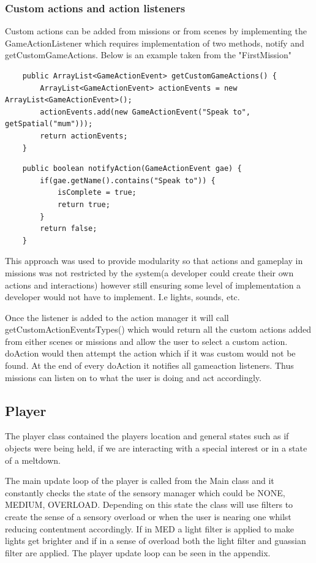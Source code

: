 \documentclass[11pt]{report}
\begin{document}
\subsubsection*{Custom actions and action listeners}
Custom actions can be added from missions or from scenes by implementing the GameActionListener which requires implementation of two methods, notify and getCustomGameActions. Below is an example taken from the "FirstMission"

\begin{lstlisting}
    public ArrayList<GameActionEvent> getCustomGameActions() {
        ArrayList<GameActionEvent> actionEvents = new ArrayList<GameActionEvent>();
        actionEvents.add(new GameActionEvent("Speak to", getSpatial("mum")));
        return actionEvents;
    }
\end{lstlisting}

\begin{lstlisting}
    public boolean notifyAction(GameActionEvent gae) {
        if(gae.getName().contains("Speak to")) {
            isComplete = true;
            return true;
        }
        return false;
    }
\end{lstlisting}

This approach was used to provide modularity so that actions and gameplay in missions was not restricted by the system(a developer could create their own actions and interactions) however still ensuring some level of implementation a developer would not have to implement. I.e lights, sounds, etc.

Once the listener is added to the action manager it will call getCustomActionEventsTypes() which would return all the custom actions added from either scenes or missions and allow the user to select a custom action. doAction would then attempt the action which if it was custom would not be found. At the end of every doAction it notifies all gameaction listeners. Thus missions can listen on to what the user is doing and act accordingly. 


\subsection{Player}
The player class contained the players location and general states such as if objects were being held, if we are interacting with a special interest or in a state of a meltdown.

The main update loop of the player is called from the Main class and it constantly checks the state of the sensory manager which could be NONE, MEDIUM, OVERLOAD. Depending on this state the class will use filters to create the sense of a sensory overload or when the user is nearing one whilst reducing contentment accordingly. If in MED a light filter is applied to make lights get brighter and if in a sense of overload both the light filter and guassian filter are applied. The player update loop can be seen in the appendix.  
 
\end{document}
